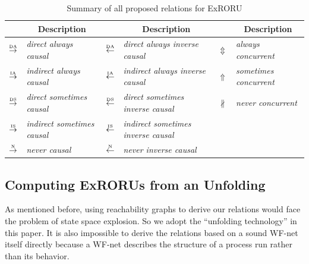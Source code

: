 \documentclass{llncs}
\begin{document}
\begin{table}[htbp]
\centering
\caption{Summary of all proposed relations for ExRORU\label{tab:relations}}
	\begin{tabular}{|c|l||c|l||c|l|} \hline
		& \multicolumn{1}{|c||}{\multirow{1}{*}{Description}} & & \multicolumn{1}{|c||}{\multirow{1}{*}{Description}} & & \multicolumn{1}{|c|}{\multirow{1}{*}{Description}}\\ \hline
		$\overset{\text{\tiny{DA}}}{\rightarrow}$ & \textit{direct always causal} & $\overset{\text{\tiny{DA}}}{\leftarrow}$ & \textit{direct always inverse causal} & $\Updownarrow$ & \textit{always concurrent}\\
		$\overset{\text{\tiny{IA}}}{\rightarrow}$ & \textit{indirect always causal} & $\overset{\text{\tiny{IA}}}{\leftarrow}$ & \textit{indirect always inverse causal} & $\Uparrow$ & \textit{sometimes concurrent}\\
		$\overset{\text{\tiny{DS}}}{\rightarrow}$ & \textit{direct sometimes causal} & $\overset{\text{\tiny{DS}}}{\leftarrow}$ & \textit{direct sometimes inverse causal} & $\nparallel$ & \textit{never concurrent}\\
		$\overset{\text{\tiny{IS}}}{\rightarrow}$ & \textit{indirect sometimes causal} & $\overset{\text{\tiny{IS}}}{\leftarrow}$ & \textit{indirect sometimes inverse causal} & & \\
		$\overset{\text{\tiny{N}}}{\rightarrow}$ & \textit{never causal} & $\overset{\text{\tiny{N}}}{\leftarrow}$ & \textit{never inverse causal} & & \\
		\hline
	\end{tabular}
\end{table}

\subsection{Computing ExRORUs from an Unfolding}\label{subsec:computationOfRelations}
As mentioned before, using reachability graphs to derive our relations would face the problem of state space explosion. %
So we adopt the ``unfolding technology'' in this paper. It is also impossible to derive the relations based on a sound WF-net itself directly because a WF-net describes the structure of a process run rather than its behavior.
\end{document}
